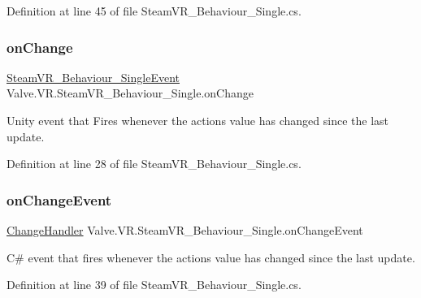 Definition at line 45 of file Steam\+V\+R\+\_\+\+Behaviour\+\_\+\+Single.\+cs.

\mbox{\label{class_valve_1_1_v_r_1_1_steam_v_r___behaviour___single_a877767f14603dcc812da6df7aa60a590}} 
\subsubsection{\texorpdfstring{onChange}{onChange}}
{\footnotesize\ttfamily \mbox{\hyperlink{class_valve_1_1_v_r_1_1_steam_v_r___behaviour___single_event}{Steam\+V\+R\+\_\+\+Behaviour\+\_\+\+Single\+Event}} Valve.\+V\+R.\+Steam\+V\+R\+\_\+\+Behaviour\+\_\+\+Single.\+on\+Change}



Unity event that Fires whenever the action\textquotesingle{}s value has changed since the last update. 



Definition at line 28 of file Steam\+V\+R\+\_\+\+Behaviour\+\_\+\+Single.\+cs.

\mbox{\label{class_valve_1_1_v_r_1_1_steam_v_r___behaviour___single_a4f4173db4aee743aa519fbc433c39f63}} 
\subsubsection{\texorpdfstring{onChangeEvent}{onChangeEvent}}
{\footnotesize\ttfamily \mbox{\hyperlink{class_valve_1_1_v_r_1_1_steam_v_r___behaviour___single_aa4d7e1b4579edc552044b04551e0e490}{Change\+Handler}} Valve.\+V\+R.\+Steam\+V\+R\+\_\+\+Behaviour\+\_\+\+Single.\+on\+Change\+Event}



C\# event that fires whenever the action\textquotesingle{}s value has changed since the last update. 



Definition at line 39 of file Steam\+V\+R\+\_\+\+Behaviour\+\_\+\+Single.\+cs.

